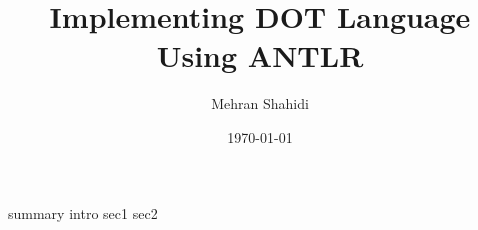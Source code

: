 \documentclass{article}
\title{Implementing DOT Language Using ANTLR}
\author{Mehran Shahidi}
\date{\today}
\begin{document}
\maketitle
{}
{summary}
\newpage
\tableofcontents
\newpage
{}
{intro}
{sec1}
{sec2}

\newpage
\end{document}

